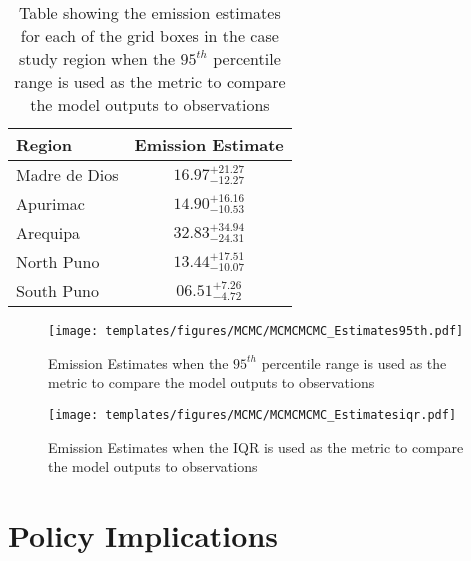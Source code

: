     
\begin{table}[H]
\caption{Table showing the emission estimates for each of the grid boxes in the case study region when the $95^{th}$ percentile range is used as the metric to compare the model outputs to observations}
    \label{tab:MCMC_estimates}
\begin{tabular}{lc}

\textbf{Region}        & \textbf{Emission Estimate}                             \\
\hline
Madre de Dios & $16.97^{+21.27}_{-12.27}$ \\

Apurimac      & $14.90^{+16.16}_{-10.53}$\\

Arequipa      & $32.83^{+34.94}_{-24.31}$ \\

North Puno    & $13.44^{+17.51}_{-10.07}$ \\

South Puno    & $06.51^{+7.26}_{-4.72}$ \\
\hline
\end{tabular}
\centering
\end{table}

\begin{figure}[H]
  \texttt{[image: templates/figures/MCMC/MCMCMCMC\_Estimates95th.pdf]}
  \centering
  \caption{Emission Estimates when the $95^{th}$ percentile range is used as the metric to compare the model outputs to observations }
  \label{fig:MCMC_estimatesiqr}
\end{figure}
\FloatBarrier

\begin{figure}[H]
  \texttt{[image: templates/figures/MCMC/MCMCMCMC\_Estimatesiqr.pdf]}
  \centering
  \caption{Emission Estimates when the IQR is used as the metric to compare the model outputs to observations }
  \label{fig:MCMC_estimates95}
\end{figure}
\FloatBarrier
\begin{flushleft}

\end{flushleft}


\section{Policy Implications}

